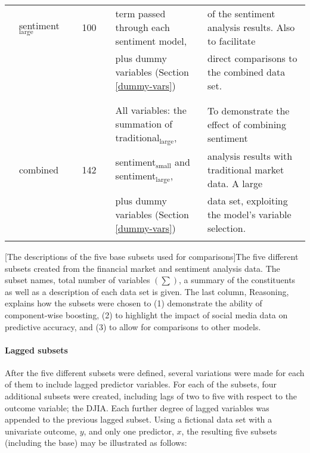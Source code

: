 \documentclass{article}
\begin{document}
\begin{landscape}
\begin{center}
\begin{tabular}{lllclll}
 & sentiment$_{\text{large}}$ &  & 100 &  & term passed through each sentiment model, & of the sentiment analysis results. Also to facilitate\\
 &  &  &  &  & plus dummy variables (Section \ref{dummy-vars}) & direct comparisons to the combined data set.\\
 &  &  &  &  &  & \\
\hline
 &  &  &  &  &  & \\
 &  &  &  &  & All variables: the summation of traditional$_{\text{large}}$, & To demonstrate the effect of combining sentiment\\
 & combined &  & 142 &  & sentiment$_{\text{small}}$ and sentiment$_{\text{large}}$, & analysis results with traditional market data. A large\\
 &  &  &  &  & plus dummy variables (Section \ref{dummy-vars}) & data set, exploiting the model's variable selection.\\
 &  &  &  &  &  & \\
\hline
\end{tabular}
\end{center}

[The descriptions of the five base subsets used for comparisons]{The five different subsets created from the financial market and sentiment analysis data. The subset names, total number of variables $\left( \sum \right)$, a summary of the constituents as well as a description of each data set is given. The last column, Reasoning, explains how the subsets were chosen to (1) demonstrate the ability of component-wise boosting, (2) to highlight the impact of social media data on predictive accuracy, and (3) to allow for comparisons to other models.}\label{tab_subsets}
\end{landscape}
\clearpage


\paragraph{Lagged subsets \label{lagged-subsets}}
\label{sec-6-2-4-1}

After the five different subsets were defined, several variations were made for each of them to include lagged predictor variables. For each of the subsets, four additional subsets were created, including lags of two to five with respect to the outcome variable; the DJIA. Each further degree of lagged variables was appended to the previous lagged subset. Using a fictional data set with a univariate outcome, $y$, and only one predictor, $x$, the resulting five subsets (including the base) may be illustrated as follows:
\end{document}
